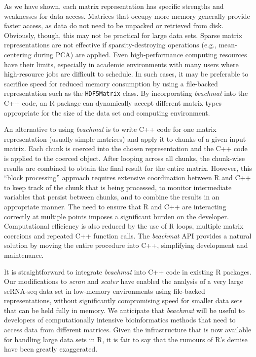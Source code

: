 \documentclass[10pt,letterpaper]{article}
\newcommand{\beachmat}{\textit{beachmat}}
\newcommand{\code}[1]{\texttt{#1}}
\begin{document}
As we have shown, each matrix representation has specific strengths and weaknesses for data access.
Matrices that occupy more memory generally provide faster access, as data do not need to be unpacked or retrieved from disk.
Obviously, though, this may not be practical for large data sets.
Sparse matrix representations are not effective if sparsity-destroying operations (e.g., mean-centering during PCA) are applied.
Even high-performance computing resources have their limits, especially in academic environments with many users where high-resource jobs are difficult to schedule.
In such cases, it may be preferable to sacrifice speed for reduced memory consumption by using a file-backed representation such as the \code{HDF5Matrix} class.
By incorporating \beachmat{} into the C++ code, an R package can dynamically accept different matrix types appropriate for the size of the data set and computing environment.

An alternative to using \beachmat{} is to write C++ code for one matrix representation (usually simple matrices) and apply it to chunks of a given input matrix.
Each chunk is coerced into the chosen representation and the C++ code is applied to the coerced object.
After looping across all chunks, the chunk-wise results are combined to obtain the final result for the entire matrix.
However, this ``block processing'' approach requires extensive coordination between R and C++ to keep track of the chunk that is being processed, to monitor intermediate variables that persist between chunks, and to combine the results in an appropriate manner.
The need to ensure that R and C++ are interacting correctly at multiple points imposes a significant burden on the developer.
Computational efficiency is also reduced by the use of R loops, multiple matrix coercions and repeated C++ function calls.
The \beachmat{} API provides a natural solution by moving the entire procedure into C++, simplifying development and maintenance.

It is straightforward to integrate \beachmat{} into C++ code in existing R packages.
Our modifications to \textit{scran} and \textit{scater} have enabled the analysis of a very large scRNA-seq data set in low-memory environments using file-backed representations, without significantly compromising speed for smaller data sets that can be held fully in memory.
We anticipate that \beachmat{} will be useful to developers of computationally intensive bioinformatics methods that need to access data from different matrices.
Given the infrastructure that is now available for handling large data sets in R, it is fair to say that the rumours of R's demise have been greatly exaggerated.
\end{document}
